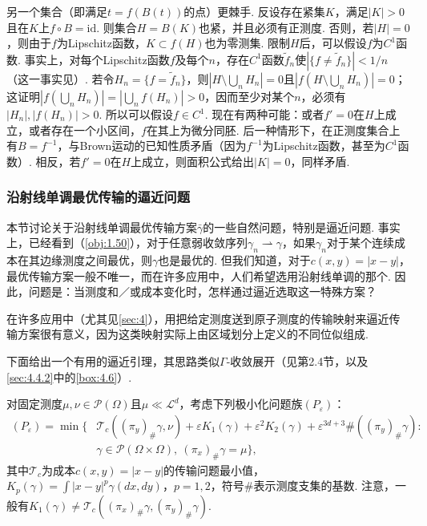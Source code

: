 另一个集合（即满足$t=f(B(t))$的点）更棘手. 反设存在紧集$K$，满足$|K|>0$且在$K$上$f\circ B=\mathrm{id}$. 则集合$H=B(K)$也紧，并且必须有正测度. 否则，若$|H|=0$，则由于$f$为Lipschitz函数，$K\subset f(H)$也为零测集. 限制$H$后，可以假设$f$为$C^1$函数. 事实上，对每个Lipschitz函数$f$及每个$n$，存在$C^1$函数$\widetilde f_n$使$|\{f\ne\widetilde f_n\}|<1/n$（这一事实见\cite{b160}）. 若令$H_n=\{f=\widetilde f_n\}$，则$|H\setminus\bigcup_nH_n|=0$且$|f(H\setminus\bigcup_nH_n)|=0$；这证明$|f(\bigcup_nH_n)|=|\bigcup_nf(H_n)|>0$，因而至少对某个$n$，必须有$|H_n|,|f(H_n)|>0$. 所以可以假设$f\in C^1$. 现在有两种可能：或者$f'=0$在$H$上成立，或者存在一个小区间，$f$在其上为微分同胚. 后一种情形下，在正测度集合上有$B=f^{-1}$，与Brown运动的已知性质矛盾（因为$f^{-1}$为Lipschitz函数，甚至为$C^1$函数）. 相反，若$f'=0$在$H$上成立，则面积公式给出$|K|=0$，同样矛盾.

\subsubsection{沿射线单调最优传输的逼近问题}\label{sec:3.1.5}
本节讨论关于沿射线单调最优传输方案$\bar\gamma$的一些自然问题，特别是逼近问题. 事实上，已经看到（\autoref{obj:1.50}），对于任意弱收敛序列$\gamma_n\rightharpoonup\gamma$，如果$\gamma_n$对于某个连续成本在其边缘测度之间最优，则$\gamma$也是最优的. 但我们知道，对于$c(x,y)=|x-y|$，最优传输方案一般不唯一，而在许多应用中，人们希望选用沿射线单调的那个. 因此，问题是：当测度和／或成本变化时，怎样通过逼近选取这一特殊方案？

在许多应用中（尤其见\autoref{sec:4}），用把给定测度送到原子测度的传输映射来逼近传输方案很有意义，因为这类映射实际上由区域划分上定义的不同位似组成.

下面给出一个有用的逼近引理，其思路类似$\Gamma$-收敛展开（见\cite{b77}第2.4节，以及\autoref{sec:4.4.2}中的\autoref{box:4.6}）.

对固定测度$\mu,\nu\in\mathscr P(\Omega)$且$\mu\ll\mathscr L^d$，考虑下列极小化问题族$(P_\varepsilon)$：
\begin{equation*}
\begin{aligned}
(P_\varepsilon)=\min\bigl\{&\mathscr T_c((\pi_y)_\#\gamma,\nu)+\varepsilon K_1(\gamma)+\varepsilon^2K_2(\gamma)
+\varepsilon^{3d+3}\#((\pi_y)_\#\gamma):\\
&\gamma\in\mathscr P(\Omega\times\Omega),\ (\pi_x)_\#\gamma=\mu\bigr\},
\end{aligned}
\end{equation*}
其中$\mathscr T_c$为成本$c(x,y)=|x-y|$的传输问题最小值，$K_p(\gamma)=\int|x-y|^p\gamma(dx,dy)$，$p=1,2$，符号$\#$表示测度支集的基数. 注意，一般有$K_1(\gamma)\ne\mathscr T_c((\pi_x)_\#\gamma,(\pi_y)_\#\gamma)$.

